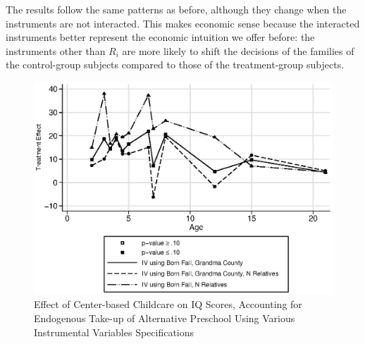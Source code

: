 \begin{appendices}
\noindent The results follow the same patterns as before, although they change when the instruments are not interacted. This makes economic sense because the interacted instruments better represent the economic intuition we offer before: the instruments other than $R_{i}$ are more likely to shift the decisions of the families of the control-group subjects compared to those of the treatment-group subjects.

\begin{figure}[H]
		\caption{Effect of Center-based Childcare on IQ Scores, Accounting for Endogenous Take-up of Alternative Preschool Using Various Instrumental Variables Specifications} \label{fig:nointer_Q_iv}
		\includegraphics[width=.7\columnwidth]{output/appendixplots/nointer_Q_iv_te.eps}
\end{figure}


\end{appendices}

